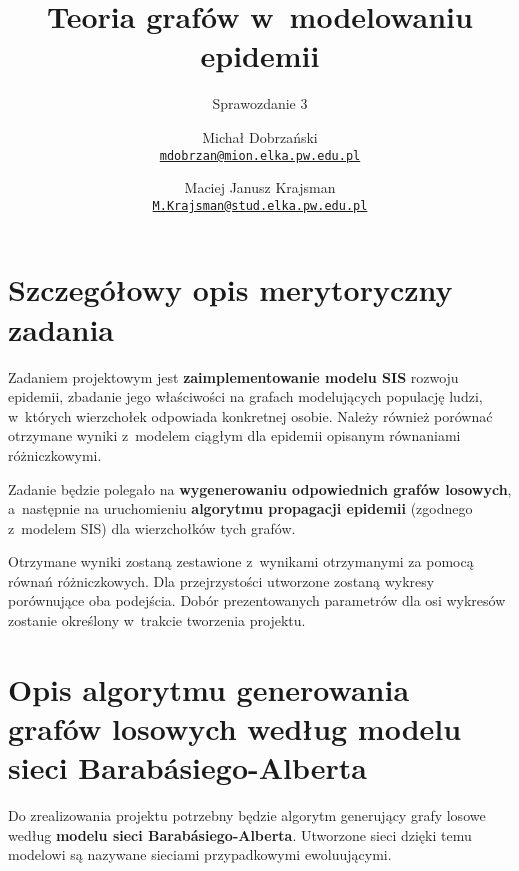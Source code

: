 

\title{Teoria grafów w~modelowaniu epidemii}
\subtitle{Sprawozdanie 3}
\author{%
	Michał Dobrzański\\
	\texttt{\href{mailto:mdobrzan@mion.elka.pw.edu.pl}%
		{\nolinkurl{mdobrzan@mion.elka.pw.edu.pl}}}
	\and
	Maciej Janusz Krajsman\\
	\texttt{\href{mailto:M.Krajsman@stud.elka.pw.edu.pl}%
		{\nolinkurl{M.Krajsman@stud.elka.pw.edu.pl}}}
}


\lstset{language=Python} 

\maketitle
\tableofcontents
\clearpage

\section{Szczegółowy opis merytoryczny zadania}
\label{sec:szczegolowy_opis_merytoryczny_zadania}

Zadaniem projektowym jest \textbf{zaimplementowanie modelu SIS} rozwoju epidemii, zbadanie jego właściwości na grafach modelujących populację ludzi, w~których wierzchołek odpowiada konkretnej osobie. Należy również porównać otrzymane wyniki z~modelem ciągłym dla epidemii opisanym równaniami różniczkowymi.  

Zadanie będzie polegało na \textbf{wygenerowaniu odpowiednich grafów losowych}, a~następnie na uruchomieniu \textbf{algorytmu propagacji epidemii} (zgodnego z~modelem SIS) dla wierzchołków tych grafów.

Otrzymane wyniki zostaną zestawione z~wynikami otrzymanymi za pomocą równań różniczkowych. Dla przejrzystości utworzone zostaną wykresy porównujące oba podejścia. Dobór prezentowanych parametrów dla osi wykresów zostanie określony w~trakcie tworzenia projektu.


\section{Opis algorytmu generowania grafów losowych według modelu sieci Barabásiego-Alberta}
\label{sec:opis_alg_ba}

Do zrealizowania projektu potrzebny będzie algorytm generujący grafy losowe według \textbf{modelu sieci Barabásiego-Alberta}. Utworzone sieci dzięki temu modelowi są nazywane sieciami przypadkowymi ewoluującymi.

